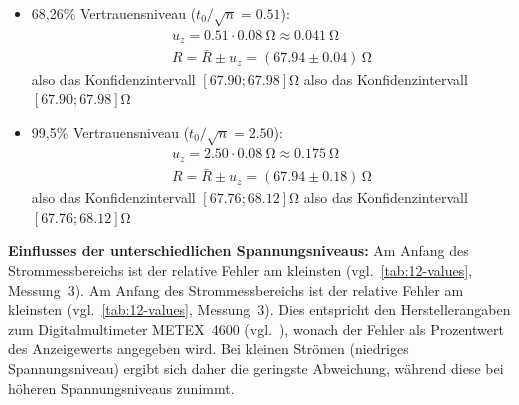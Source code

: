 \begin{itemize}
	\item 68,26\% Vertrauensniveau ($t_{0}/\sqrt{n} = 0.51$):
		\begin{gather*}
			u_{z} = 0.51 \cdot \SI{0.08}{\ohm} \approx \SI{0.041}{\ohm} \\
			R = \bar{R} \pm u_{z} = (67.94 \pm 0.04) \, \si{\ohm}
		\end{gather*}
		also das Konfidenzintervall $[67.90; 67.98]\si{\ohm}$
		also das Konfidenzintervall $[67.90; 67.98]\si{\ohm}$

	\item 99,5\% Vertrauensniveau ($t_{0}/\sqrt{n} = 2.50$):
		\begin{gather*}
			u_{z} = 2.50 \cdot \SI{0.08}{\ohm} \approx \SI{0.175}{\ohm} \\
			R = \bar{R} \pm u_{z} = (67.94 \pm 0.18) \, \si{\ohm}
		\end{gather*}
		also das Konfidenzintervall $[67.76; 68.12]\si{\ohm}$
		also das Konfidenzintervall $[67.76; 68.12]\si{\ohm}$
\end{itemize}

\marginref{\ref{itm:1-P2-4}}
\textbf{Einflusses der unterschiedlichen Spannungsniveaus:} Am Anfang des
Strommessbereichs ist der relative Fehler am kleinsten
(vgl.~\autoref{tab:12-values}, Messung~3). Am Anfang des Strommessbereichs ist
der relative Fehler am kleinsten (vgl.~\autoref{tab:12-values}, Messung~3).
Dies entspricht den Herstellerangaben zum Digitalmultimeter METEX~4600
(vgl.~\cite[S.~143]{EMTPraktikum2025}), wonach der Fehler als Prozentwert des
Anzeigewerts angegeben wird. Bei kleinen Strömen (niedriges Spannungsniveau)
ergibt sich daher die geringste Abweichung, während diese bei höheren
Spannungsniveaus zunimmt.

